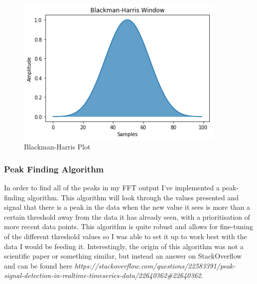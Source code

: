 \documentclass[12pt]{report}
\begin{document}
\begin{figure}[H]
	\centering
    \includegraphics[width=0.9\textwidth]{blackman_harris.PNG}
	\caption{Blackman-Harris Plot}\label{bm_plot}
	\centering
\end{figure}

\subsubsection*{Peak Finding Algorithm}
In order to find all of the peaks in my FFT output I've implemented a peak-finding algorithm. This algorithm will look through the values presented and signal that there is a peak in the data when the new value it sees is more than a certain threshold away from the data it has already seen, with a prioritisation of more recent data points. This algorithm is quite robust and allows for fine-tuning of the different threshold values so I was able to set it up to work best with the data I would be feeding it. Interestingly, the origin of this algorithm was not a scientific paper or something similar, but instead an answer on StackOverflow and can be found here \textit{https://stackoverflow.com/questions/22583391/peak-signal-detection-in-realtime-timeseries-data/22640362\#22640362}.
\end{document}
